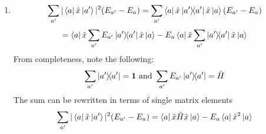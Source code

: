 \begin{sol}
\begin{enumerate}[label=\textbf{(\alph*)}]
\item

\begin{equation}
	\sum_{a'}|\bra a\hat x\ket{a'}|^2(E_{a'}-E_a)=\sum_{a'}\bra a\hat x\ketbra {a'}{a'}\hat x\ket{a}(E_{a'}-E_a)
\end{equation}
\begin{equation}
	=\bra a\hat x\sum_{a'}E_{a'}\ketbra{a'}{a'}\hat x\ket a-E_{a}\bra a\hat x\sum_{a'}\ketbra{a'}{a'}\hat x\ket a
\end{equation}
From completeness, note the following:
\begin{equation}
	\sum_{a'}\ketbra{a'}{a'}=\mathbf{1}\text{ and }\sum_{a'}E_{a'}\ketbra{a'}{a'}=\hat H
\end{equation} 
The sum can be rewritten in terms of single matrix elements
\begin{equation}
	\sum_{a'}|\bra a\hat x\ket{a'}|^2(E_{a'}-E_a)=\bra a\hat x\hat H\hat x\ket a-E_a\bra a\hat x^2\ket a
\end{equation}


\end{enumerate}
\end{sol}
